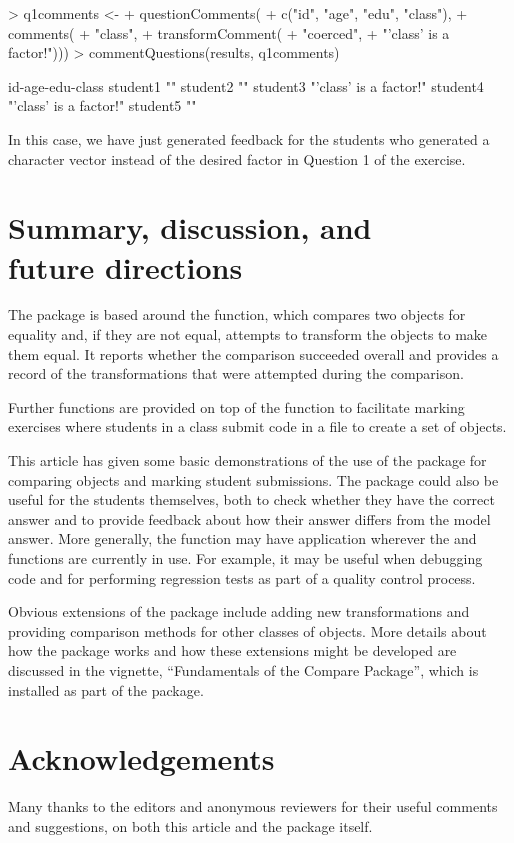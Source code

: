\begin{Schunk}
\begin{Sinput}
> q1comments <-
+     questionComments(
+         c("id", "age", "edu", "class"),
+         comments(
+             "class",
+             transformComment(
+                 "coerced",
+                 "'class' is a factor!")))
> commentQuestions(results, q1comments)
\end{Sinput}
\begin{Soutput}
         id-age-edu-class      
student1 ""                    
student2 ""                    
student3 "'class' is a factor!"
student4 "'class' is a factor!"
student5 ""                    
\end{Soutput}
\end{Schunk}
In  this case, we have just generated feedback for the students
who generated a character vector instead of the desired factor
in Question 1 of the exercise.

\section*{Summary, discussion, and\\future directions}

The  package is based around the  
function, which compares two objects for equality and, if they
are not equal, attempts
to transform the objects to make them equal.  It reports whether 
the comparison succeeded overall and provides a record of 
the transformations that were
attempted during the comparison.

Further functions are provided on top of the  
function to facilitate marking exercises where students in a class
submit \R{} code in a file to create a set of \R{} objects.

This article has given some basic demonstrations of the use of 
the  package for comparing objects and marking 
student submissions.  The package could also be useful for the
students themselves, both to check whether they have the correct 
answer and to provide feedback about how their answer differs 
from the model answer.  More generally, the 
function may have application wherever the 
and  functions are currently in use.  For example,
it may be useful when debugging code and for performing regression
tests as part of a quality control process.

Obvious extensions of the  package include adding
new transformations and providing comparison 
methods for other classes of objects.  
More details about how the package works and how these 
extensions might be developed are discussed in
the vignette, ``Fundamentals of the Compare Package'',
which is installed as part of the  package.

\section*{Acknowledgements}

Many thanks to the editors and anonymous reviewers for their useful
comments and suggestions, on both this article and the 
 package itself.



